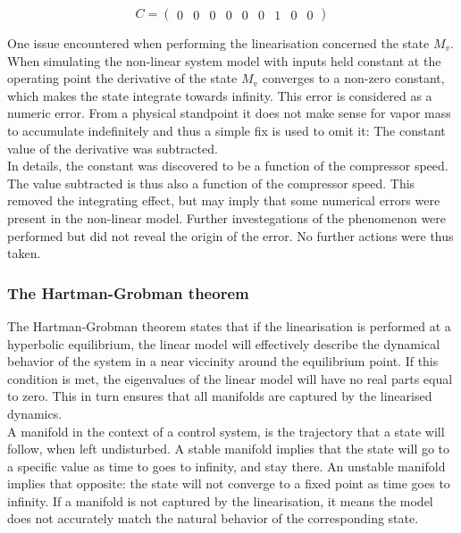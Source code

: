 \begin{equation}  \label{eq:C}
	C =\left(\begin{array}{ccccccccc}
		0 & 0 & 0 & 0 & 0 & 0 & 1 & 0 & 0
	\end{array}\right)
\end{equation}

One issue encountered when performing the linearisation concerned the state $M_v$. When simulating the non-linear system model with inputs held constant at the operating point the derivative of the state $M_v$ converges to a non-zero constant, which makes the state integrate towards infinity. This error is considered as a numeric error. From a physical standpoint it does not make sense for vapor mass to accumulate indefinitely and thus a simple fix is used to omit it: The constant value of the derivative was subtracted. \\

In details, the constant was discovered to be a function of the compressor speed. The value subtracted is thus also a function of the compressor speed. This removed the integrating effect, but may imply that some numerical errors were present in the non-linear model. Further investegations of the phenomenon were performed but did not reveal the origin of the error. No further actions were thus taken.

\subsubsection{The Hartman-Grobman theorem} \label{sec:hartman}

The Hartman-Grobman theorem states that if the linearisation is performed at a hyperbolic equilibrium, the linear model will effectively describe the dynamical behavior of the system in a near viccinity around the equilibrium point. If this condition is met, the eigenvalues of the linear model will have no real parts equal to zero. This in turn ensures that all manifolds are captured by the linearised dynamics. \\
A manifold in the context of a control system, is the trajectory that a state will follow, when left undisturbed. A stable manifold implies that the state will go to a specific value as time to goes to infinity, and stay there. An unstable manifold implies that opposite: the state will not converge to a fixed point as time goes to infinity. If a manifold is not captured by the linearisation, it means the model does not accurately match the natural behavior of the corresponding state.\\

